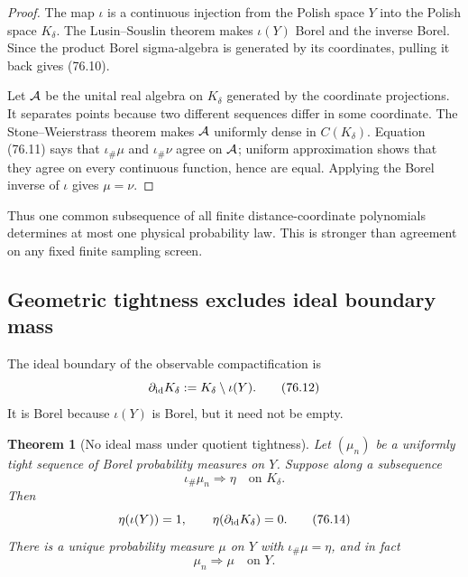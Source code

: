\documentclass[11pt]{article}
\newtheorem{theorem}{Theorem}[section]
\theoremstyle{remark}
\begin{document}
\begin{proof}
The map \(\iota\) is a continuous injection from the Polish space
\(Y\) into the Polish space \(K_\delta\).  The Lusin--Souslin theorem
makes \(\iota(Y)\) Borel and the inverse Borel.  Since the product
Borel sigma-algebra is generated by its coordinates, pulling it back
gives (76.10).

Let \({\cal A}\) be the unital real algebra on \(K_\delta\) generated
by the coordinate projections.  It separates points because two
different sequences differ in some coordinate.  The Stone--Weierstrass
theorem makes \({\cal A}\) uniformly dense in
\(C(K_\delta)\).  Equation (76.11) says that
\(\iota_\#\mu\) and \(\iota_\#\nu\) agree on \({\cal A}\); uniform
approximation shows that they agree on every continuous function,
hence are equal.  Applying the Borel inverse of \(\iota\) gives
\(\mu=\nu\).
\end{proof}

Thus one common subsequence of all finite distance-coordinate
polynomials determines at most one physical probability law.  This
is stronger than agreement on any fixed finite sampling screen.

\subsection{Geometric tightness excludes ideal boundary mass}

The ideal boundary of the observable compactification is
\begin{equation}
                         \partial_{\rm id}K_\delta
 :=K_\delta\setminus\iota(Y).                               \tag{76.12}
\end{equation}
It is Borel because \(\iota(Y)\) is Borel, but it need not be empty.

\begin{theorem}[No ideal mass under quotient tightness]
\label{thm:v12v76-no-ideal}
Let \((\mu_n)\) be a uniformly tight sequence of Borel probability
measures on \(Y\).  Suppose along a subsequence
\begin{equation}
                         \iota_\#\mu_n\Rightarrow\eta
                         \quad\text{on }K_\delta.            \tag{76.13}
\end{equation}
Then
\begin{equation}
                  \eta(\iota(Y))=1,\qquad
                  \eta(\partial_{\rm id}K_\delta)=0.         \tag{76.14}
\end{equation}
There is a unique probability measure \(\mu\) on \(Y\) with
\(\iota_\#\mu=\eta\), and in fact
\begin{equation}
                              \mu_n\Rightarrow\mu
                              \quad\text{on }Y.              \tag{76.15}
\end{equation}
\end{theorem}
\end{document}
